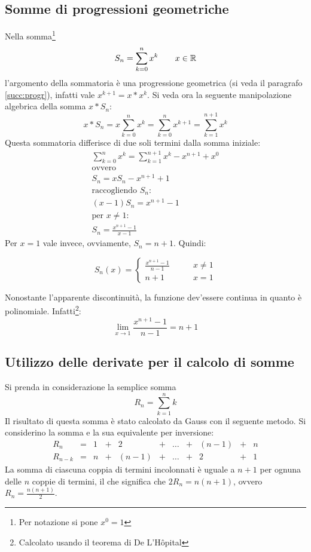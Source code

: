 \subsection{Somme di progressioni geometriche}
\label{sum:geompar}
Nella somma\footnote{Per notazione si pone $x^0=1$}
\[
	S_n=\sum_{k=0}^n x^k\qquad x\in\mathbb{R}
\]
l'argomento della sommatoria è una progressione geometrica (si veda il paragrafo \vref{succ:progr}), infatti vale $x^{k+1}=x*x^k$. Si veda ora la seguente manipolazione algebrica della somma $x*S_n$:
\[
	x*S_n=x\sum_{k=0}^n x^k=\sum_{k=0}^n x^{k+1}=\sum_{k=1}^{n+1} x^k
\]
Questa sommatoria differisce di due soli termini dalla somma iniziale:
\begin{gather*}
	\sum_{k=0}^n x^k=\sum_{k=1}^{n+1} x^k-x^{n+1}+x^0\\
	\text{ovvero}\\
	S_n=xS_n-x^{n+1}+1\\
	\text{raccogliendo $S_n$:}\\
	(x-1)S_n=x^{n+1}-1\\
	\text{per $x\neq1$:}\\
	S_n=\frac{x^{n+1}-1}{x-1}
\end{gather*}
Per $x=1$ vale invece, ovviamente, $S_n=n+1$. Quindi:
\begin{prop}
	\label{sum:geom}
	\[
		S_n(x)=
		\begin{cases}
			\frac{x^{n+1}-1}{n-1}\qquad & x\neq1 \\
			n+1\qquad                   & x=1
		\end{cases}
	\]
\end{prop}
Nonostante l'apparente discontinuità, la funzione dev'essere continua in quanto è polinomiale. Infatti\footnote{Calcolato usando il teorema di De L'Hôpital}:
\[
	\lim_{x\to1}\frac{x^{n+1}-1}{n-1}=n+1
\]


\subsection[Somma tramite derivata]{Utilizzo delle derivate per il calcolo di somme}
Si prenda in considerazione la semplice somma
\[
	R_n=\sum_{k=1}^n k
\]
Il risultato di questa somma è stato calcolato da Gauss con il seguente metodo. Si considerino la somma e la sua equivalente per inversione:
\[
	\begin{array}{cccccccccccc}
		R_n     & = & 1 & + & 2     & + & \dots & + & (n-1) & + & n \\
		R_{n-k} & = & n & + & (n-1) & + & \dots & + & 2     & + & 1
	\end{array}
\]
La somma di ciascuna coppia di termini incolonnati è uguale a $n+1$ per ognuna delle $n$ coppie di termini, il che significa che $2R_n=n(n+1)$, ovvero $R_n=\frac{n(n+1)}{2}$.

